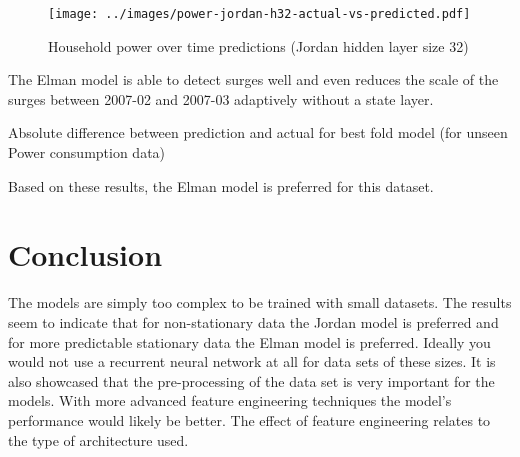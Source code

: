 \documentclass[conference]{IEEEtran}
\begin{document}
\begin{figure}[H] 
	\centering
	\texttt{[image: ../images/power-jordan-h32-actual-vs-predicted.pdf]}
	\caption{Household power over time predictions (Jordan hidden layer size 32)}
	\label{fig:power-predictions-jordan}
\end{figure}

The Elman model is able to detect surges well and even reduces the scale of the surges between 2007-02 and 2007-03 adaptively without a state layer.

\begin{table}[H]
	\caption{Absolute difference between prediction and actual for best fold model (for unseen Power consumption data)}
	\label{tab:power-rnn-summary}
\end{table}

Based on these results, the Elman model is preferred for this dataset.

\section{Conclusion}

The models are simply too complex to be trained with small datasets. The results seem to indicate that for non-stationary data the Jordan model is preferred and for more predictable stationary data the Elman model is preferred. Ideally you would not use a recurrent neural network at all for data sets of these sizes. It is also showcased that the pre-processing of the data set is very important for the models. With more advanced feature engineering techniques the model's performance would likely be better. The effect of feature engineering relates to the type of architecture used. 
\end{document}
